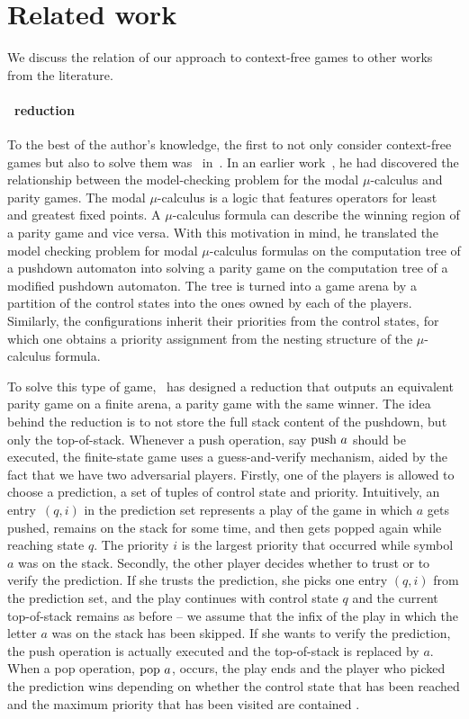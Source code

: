 \documentclass[../../diss.tex]{subfiles}
\begin{document}
\section{Related work}%
\label{Section:CFGamesRelWork}%

We discuss the relation of our approach to context-free games to other works from the literature.

\paragraph{\Walus~reduction}

To the best of the author's knowledge, the first to not only consider context-free games but also to solve them was \Walu~in~\cite{Walukiewicz01}.
In an earlier work~\cite{Walukiewicz02}, he had discovered the relationship between the model-checking problem for the modal $\mu$-calculus and parity games.
The modal $\mu$-calculus is a logic that features operators for least and greatest fixed points.
A $\mu$-calculus formula can describe the winning region of a parity game and vice versa.
With this motivation in mind, he translated the model checking problem for modal $\mu$-calculus formulas on the computation tree of a pushdown automaton into solving a parity game on the computation tree of a modified pushdown automaton.
The tree is turned into a game arena by a partition of the control states into the ones owned by each of the players.
Similarly, the configurations inherit their priorities from the control states, for which one obtains a priority assignment from the nesting structure of the $\mu$-calculus formula.

To solve this type of game, \Walu~has designed a reduction that outputs an equivalent parity game on a finite arena, \ie a parity game with the same winner.
The idea behind the reduction is to not store the full stack content of the pushdown, but only the top-of-stack.
Whenever a push operation, say $\text{push}~ a$ should be executed, the finite-state game uses a guess-and-verify mechanism, aided by the fact that we have two adversarial players.
Firstly, one of the players is allowed to choose a prediction, a set of tuples of control state and priority.
Intuitively, an entry~$(q,i)$ in the prediction set represents a play of the game in which $a$ gets pushed, remains on the stack for some time, and then gets popped again while reaching state $q$.
The priority $i$ is the largest priority that occurred while symbol $a$ was on the stack.
Secondly, the other player decides whether to trust or to verify the prediction.
If she trusts the prediction, she picks one entry $(q,i)$ from the prediction set, and the play continues with control state $q$ and the current top-of-stack remains as before -- we assume that the infix of the play in which the letter $a$ was on the stack has been skipped.
If she wants to verify the prediction, the push operation is actually executed and the top-of-stack is replaced by $a$.
When a pop operation, $\text{pop}~ a$, occurs, the play ends and the player who picked the prediction wins depending on whether the control state that has been reached and the maximum priority that has been visited are contained .
\end{document}
